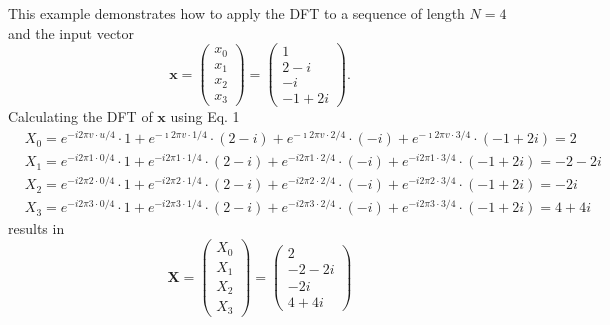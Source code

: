 \begin{example}
    This example demonstrates how to apply the DFT to a sequence of length $N=4$ and the input vector
\begin{equation}
    \mathbf{x}=\left(\begin{array}{l}
x_0 \\
x_1 \\
x_2 \\
x_3
\end{array}\right)=\left(\begin{array}{c}
1 \\
2-i \\
-i \\
-1+2 i
\end{array}\right) .
\end{equation}
Calculating the DFT of $\mathbf{x}$ using Eq. 1
\begin{equation}
\begin{aligned}
& X_0=e^{-i 2 \pi v \cdot u / 4} \cdot 1+e^{-\imath 2 \pi v \cdot 1 / 4} \cdot(2-i)+e^{-\imath 2 \pi v \cdot 2 / 4} \cdot(-i)+e^{-\imath 2 \pi v \cdot 3 / 4} \cdot(-1+2 i)=2 \\
& X_1=e^{-i 2 \pi 1 \cdot 0 / 4} \cdot 1+e^{-i 2 \pi 1 \cdot 1 / 4} \cdot(2-i)+e^{-i 2 \pi 1 \cdot 2 / 4} \cdot(-i)+e^{-i 2 \pi 1 \cdot 3 / 4} \cdot(-1+2 i)=-2-2 i \\
& X_2=e^{-i 2 \pi 2 \cdot 0 / 4} \cdot 1+e^{-i 2 \pi 2 \cdot 1 / 4} \cdot(2-i)+e^{-i 2 \pi 2 \cdot 2 / 4} \cdot(-i)+e^{-i 2 \pi 2 \cdot 3 / 4} \cdot(-1+2 i)=-2 i \\
& X_3=e^{-i 2 \pi 3 \cdot 0 / 4} \cdot 1+e^{-i 2 \pi 3 \cdot 1 / 4} \cdot(2-i)+e^{-i 2 \pi 3 \cdot 2 / 4} \cdot(-i)+e^{-i 2 \pi 3 \cdot 3 / 4} \cdot(-1+2 i)=4+4 i
\end{aligned}
\end{equation}
results in
\begin{equation}
    \mathbf{X}=\left(\begin{array}{c}
X_0 \\
X_1 \\
X_2 \\
X_3
\end{array}\right)=\left(\begin{array}{c}
2 \\
-2-2 i \\
-2 i \\
4+4 i
\end{array}\right)
\end{equation}
\end{example}

